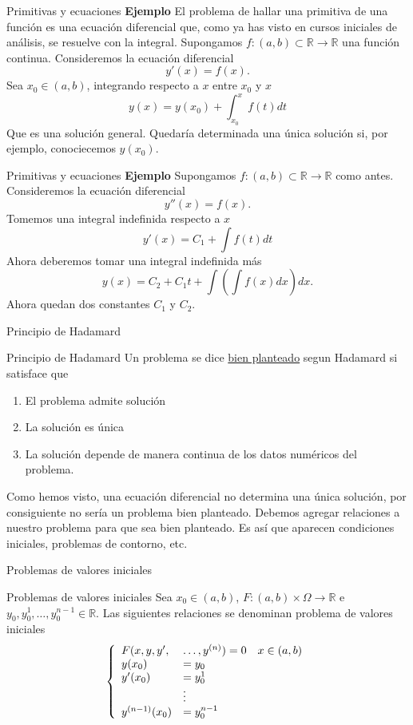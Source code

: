\documentclass[handout,hyperref={colorlinks=true}]{beamer}
\newcommand{\rr}{\mathbb{R}}
\newcommand{\nl}{\onslide<+-> }
\begin{document}
\begin{frame}{Primitivas y ecuaciones}
\textbf{Ejemplo} El problema de hallar una primitiva de una función es una ecuación diferencial que, como ya has visto en cursos iniciales de análisis, se resuelve 
con la integral. Supongamos $f:(a,b)\subset \rr\to\rr$ una función continua. Consideremos la ecuación diferencial
\[y'(x)=f(x).\]
Sea $x_0\in(a,b)$, integrando respecto a $x$ entre $x_0$ y $x$
\[y(x)=y(x_0)+\int_{x_0}^xf(t)dt\]
Que es una solución general. Quedaría determinada una única solución si, por ejemplo, conociecemos $y(x_0)$.
\end{frame}

\begin{frame}{Primitivas y ecuaciones}
\textbf{Ejemplo} Supongamos $f:(a,b)\subset \rr\to\rr$ como antes. Consideremos la ecuación diferencial
\[y''(x)=f(x).\]
Tomemos una integral indefinida respecto a $x$ 
\[y'(x)=C_1+\int f(t)dt\]
Ahora deberemos tomar una integral indefinida más
\[y(x)=C_2+C_1t +\int\left(\int f(x)dx\right)dx.\]
Ahora quedan dos constantes $C_1$ y $C_2$. 
\end{frame}


\begin{frame}{Principio de Hadamard}
\nl \begin{block}{Principio de Hadamard}
 Un problema se dice \href{http://es.wikipedia.org/wiki/Problema_bien_definido}{bien planteado} segun Hadamard si satisface que
 \begin{enumerate}
  \item El problema admite solución
  \item La solución es única
  \item La solución depende de manera continua de los datos numéricos del problema.
 \end{enumerate}
 \end{block}
\nl Como hemos visto, una ecuación diferencial no determina una única solución, por consiguiente no sería un problema bien planteado. Debemos agregar relaciones
a nuestro problema para que sea bien planteado. Es así que aparecen condiciones iniciales, problemas de contorno, etc.
 


\end{frame}


\begin{frame}{Problemas de valores iniciales}
\begin{block}{Problemas de valores iniciales} Sea $x_0\in(a,b)$, $F:(a,b)\times \Omega\to\rr$ e $y_0,y_0^1,\ldots,y_0^{n-1}\in\rr$. Las siguientes relaciones  se denominan problema de 
valores iniciales
\[
 \left\{\begin{array}{l l l}
         F(x,y,y',&\ldots,y^{(n)})=0& x\in(a,b)\\
         y(x_0)&=y_0&\\
         y'(x_0)&=y_0^1&\\
          & \vdots &\\
          y^{(n-1)}(x_0)&=y_0^{n-1}&\\
        \end{array}
   \right.
\]
\end{block}
\end{frame}
\end{document}
